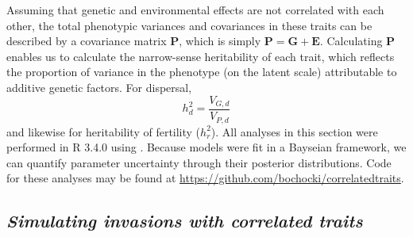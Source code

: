 Assuming that genetic and environmental effects are not correlated with each other, the total phenotypic variances and covariances in these traits can be described by a covariance matrix $\bm{P}$, which is simply $\bm{P} = \bm{G} + \bm{E}$. Calculating $\bm{P}$ enables us to calculate the narrow-sense heritability of each trait, which reflects the proportion of variance in the phenotype (on the latent scale) attributable to additive genetic factors. For dispersal,
%
\begin{equation}\label{corr:heritability}
  h^{2}_d = \frac{V_{G,d}}{V_{P,d}}
\end{equation}
%
and likewise for heritability of fertility ($h^{2}_r$). All analyses in this section were performed in R 3.4.0 \citep{r_core_team_r:_2015} using  \citep{stan_development_team_rstan:_2015}. Because models were fit in a Bayseian framework, we can quantify parameter uncertainty through their posterior distributions. Code for these analyses may be found at \url{https://github.com/bochocki/correlatedtraits}. 

\subsection{\textit{Simulating invasions with correlated traits}}

